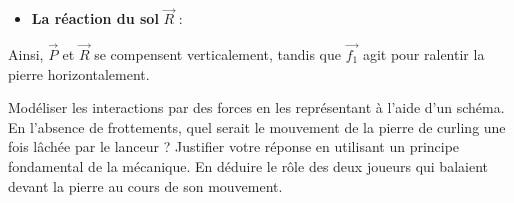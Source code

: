\documentclass{exam}
\begin{document}
\begin{questions}
\begin{solution}
\begin{itemize}
        \item \textbf{La réaction du sol} $\vec{R}$ :  
    \end{itemize}
    
    Ainsi, $\vec{P}$ et $\vec{R}$ se compensent verticalement, tandis que $\vec{f_1}$ agit pour ralentir la pierre horizontalement.
    \end{solution}
  \question[2] Modéliser les interactions par des forces en les représentant à l’aide d’un schéma.
  \question[2] En l’absence de frottements, quel serait le mouvement de la pierre de curling une fois lâchée par le lanceur ? Justifier votre réponse en utilisant un principe fondamental de la mécanique.
  \question[2] En déduire le rôle des deux joueurs qui balaient devant la pierre au cours de son mouvement.
\end{questions}
\end{document}

